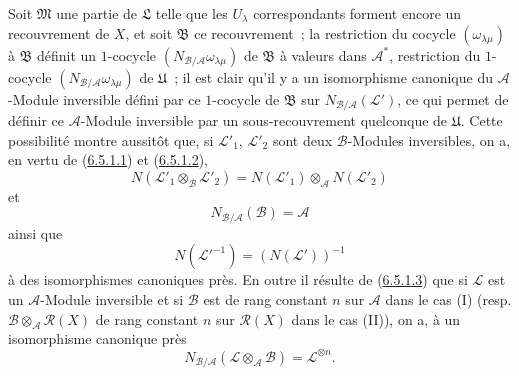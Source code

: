 \begin{env}[6.5.2]
Soit $\mathfrak{M}$ une partie de $\mathfrak{L}$ telle que les $U_\lambda$
correspondants forment encore un recouvrement de $X$, et soit $\mathfrak{B}$
ce recouvrement~; la restriction du cocycle $(\omega_{\lambda\mu})$ à
$\mathfrak{B}$ définit un $1$-cocycle
$(N_{\mathcal{B}/\mathcal{A}}\omega_{\lambda\mu})$ de $\mathfrak{B}$ à
valeurs dans $\mathcal{A}^*$, restriction du $1$-cocycle
$(N_{\mathcal{B}/\mathcal{A}}\omega_{\lambda\mu})$ de $\mathfrak{U}$~; il est
clair qu'il y a un isomorphisme canonique du $\mathcal{A}$-Module inversible
défini par ce $1$-cocycle de $\mathfrak{B}$ sur
$N_{\mathcal{B}/\mathcal{A}}(\mathcal{L}')$, ce qui permet de définir ce
$\mathcal{A}$-Module inversible par un sous-recouvrement quelconque de
$\mathfrak{U}$. Cette possibilité montre aussitôt que, si
$\mathcal{L}'_1$, $\mathcal{L}'_2$ sont deux $\mathcal{B}$-Modules inversibles,
on a, en vertu de (\hyperref[II.6.5.1.1-fr]{6.5.1.1}) et
(\hyperref[II.6.5.1.2-fr]{6.5.1.2}),
\[
\label{II.6.5.2.1-fr}
N(\mathcal{L}'_1\otimes_{\mathcal{B}}\mathcal{L}'_2)
=N(\mathcal{L}'_1)\otimes_{\mathcal{A}}N(\mathcal{L}'_2)
\tag{6.5.2.1}
\]
et
\[
\label{II.6.5.2.2-fr}
N_{\mathcal{B}/\mathcal{A}}(\mathcal{B})=\mathcal{A}
\tag{6.5.2.2}
\]
ainsi que
\[
\label{II.6.5.2.3-fr}
N(\mathcal{L}'^{-1})=(N(\mathcal{L}'))^{-1}
\tag{6.5.2.3}
\]
à des isomorphismes canoniques près. En outre il résulte de
(\hyperref[II.6.5.1.3-fr]{6.5.1.3}) que si $\mathcal{L}$ est un
$\mathcal{A}$-Module inversible et si $\mathcal{B}$ est de rang constant $n$
sur $\mathcal{A}$ dans le cas (I) (resp.
$\mathcal{B}\otimes_{\mathcal{A}}\mathcal{R}(X)$ de rang constant $n$ sur
$\mathcal{R}(X)$ dans le cas (II)), on a, à un isomorphisme canonique près
\[
\label{II.6.5.2.4-fr}
N_{\mathcal{B}/\mathcal{A}}(\mathcal{L}\otimes_{\mathcal{A}}\mathcal{B})
=\mathcal{L}^{\otimes n}.
\tag{6.5.2.4}
\]
\end{env}

